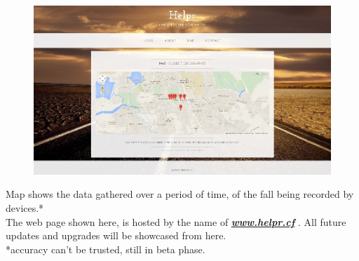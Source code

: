 \begin{figure}[h] 
\FloatBarrier
	\centering
	\includegraphics[height=0.47\textheight]{fig01/web}
	\label{fig:RHP05}

\end{figure}
Map shows the data gathered over a period of time, of the fall being recorded by devices.* \\
The web page shown here, is hosted by the name of  \underline{\textbf{ \textit{www.helpr.cf}}} . All future updates and upgrades will be showcased from here.\\
\vfill
*accuracy can't be trusted, still in beta phase.


\newpage
%
